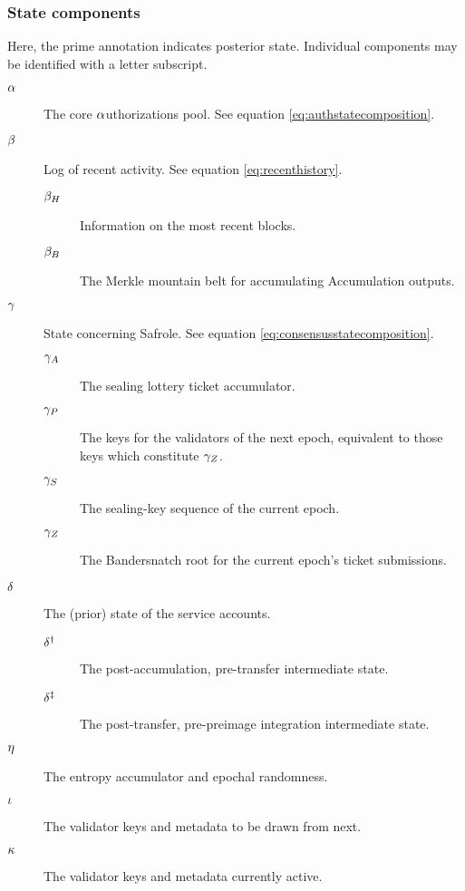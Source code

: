\subsubsection{State components}

Here, the prime annotation indicates posterior state. Individual components may be identified with a letter subscript.
\begin{description}
  \item[$\alpha$] The core $\alpha$uthorizations pool. See equation \ref{eq:authstatecomposition}. %
  \item[$\beta$] Log of recent activity. See equation \ref{eq:recenthistory}. %
  \begin{description}
    \item[$\beta_H$] Information on the most recent blocks.
    \item[$\beta_B$] The Merkle mountain belt for accumulating Accumulation outputs.
  \end{description}
  \item[$\gamma$] State concerning Safrole. See equation \ref{eq:consensusstatecomposition}. %
  \begin{description}
    \item[$\gamma_A$] The sealing lottery ticket accumulator.
    \item[$\gamma_P$] The keys for the validators of the next epoch, equivalent to those keys which constitute $\gamma_Z$.
    \item[$\gamma_S$] The sealing-key sequence of the current epoch.
    \item[$\gamma_Z$] The Bandersnatch root for the current epoch's ticket submissions.
  \end{description}
  \item[$\delta$] The (prior) state of the service accounts. %
  \begin{description}
    \item[$\delta^\dagger$] The post-accumulation, pre-transfer intermediate state. %
    \item[$\delta^\ddagger$] The post-transfer, pre-preimage integration intermediate state. %
  \end{description}
  \item[$\eta$] The entropy accumulator and epochal randomness. %
  \item[$\iota$] The validator keys and metadata to be drawn from next. %
  \item[$\kappa$] The validator keys and metadata currently active. %

\end{description}
